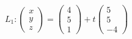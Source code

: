 \documentclass[preview]{standalone}
\begin{document}
\begin{align*}
L_1:\begin{pmatrix}x\\y\\z\end{pmatrix}=\begin{pmatrix}4\\5\\1\end{pmatrix}+t\begin{pmatrix}5\\5\\-4\end{pmatrix}
\end{align*}
\end{document}
